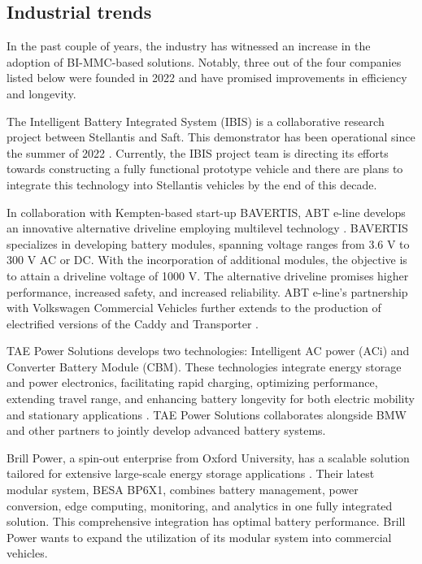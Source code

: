 \documentclass{article}
\begin{document}
\subsection{Industrial trends}
In the past couple of years, the industry has witnessed an increase in the adoption of BI-MMC-based solutions. Notably, three out of the four companies listed below were founded in 2022 and have promised improvements in efficiency and longevity.    

The Intelligent Battery Integrated System (IBIS) is a collaborative research project between Stellantis and Saft. This demonstrator has been operational since the summer of 2022 \cite{ChargedEVs}. Currently, the IBIS project team is directing its efforts towards constructing a fully functional prototype vehicle and there are plans to integrate this technology into Stellantis vehicles by the end of this decade. 

In collaboration with Kempten-based start-up BAVERTIS, ABT e-line develops an innovative alternative driveline employing multilevel technology \cite{ABTSportsline}. BAVERTIS specializes in developing battery modules, spanning voltage ranges from 3.6 V to 300 V AC or DC. With the incorporation of additional modules, the objective is to attain a driveline voltage of 1000 V. The alternative driveline promises higher performance, increased safety, and increased reliability. ABT e-line's partnership with Volkswagen Commercial Vehicles further extends to the production of electrified versions of the Caddy and Transporter \cite{ABTeline}. 

TAE Power Solutions develops two technologies: Intelligent AC power (ACi) and Converter Battery Module (CBM). These technologies integrate energy storage and power electronics, facilitating rapid charging, optimizing performance, extending travel range, and enhancing battery longevity for both electric mobility and stationary applications \cite{TAETech}. TAE Power Solutions collaborates alongside BMW and other partners to jointly develop advanced battery systems.

Brill Power, a spin-out enterprise from Oxford University, has a scalable solution tailored for extensive large-scale energy storage applications \cite{BrillPower}. Their latest modular system, BESA BP6X1, combines battery management, power conversion, edge computing, monitoring, and analytics in one fully integrated solution. This comprehensive integration has optimal battery performance. Brill Power wants to expand the utilization of its modular system into commercial vehicles.
\end{document}
